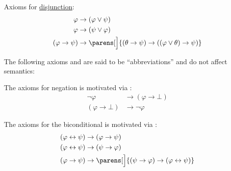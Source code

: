 \begin{definition}
\begin{thmenum}[series=def:minimal_propositional_axiomatic_derivation_system]
     Axioms for \hyperref[def:propositional_language/connectives/disjunction]{disjunction}:
    \begin{align}
      \varphi                    &\rightarrow (\varphi \vee \psi) \label{eq:def:minimal_propositional_axiomatic_derivation_system/or_elim_left} \\
      \varphi                    &\rightarrow (\psi \vee \varphi) \label{eq:def:minimal_propositional_axiomatic_derivation_system/or_elim_right} \\
      (\varphi \rightarrow \psi) &\rightarrow \parens[\Big]{ (\theta \rightarrow \psi) \rightarrow ((\varphi \vee \theta) \rightarrow \psi) } \label{eq:def:minimal_propositional_axiomatic_derivation_system/or_intro}
    \end{align}
  \end{thmenum}

  The following axioms and are said to be \enquote{abbreviations} and do not affect semantics:
  \begin{thmenum}[resume=def:minimal_propositional_axiomatic_derivation_system]
     The axioms for negation is motivated via :
    \begin{align}
      \neg \varphi &\rightarrow (\varphi \rightarrow \bot) \label{eq:def:minimal_propositional_axiomatic_derivation_system/neg_elim} \\
      (\varphi \rightarrow \bot) &\rightarrow \neg \varphi \label{eq:def:minimal_propositional_axiomatic_derivation_system/neg_intro}
    \end{align}

     The axioms for the biconditional is motivated via :
    \begin{align}
      (\varphi \leftrightarrow \psi) &\rightarrow (\varphi \rightarrow \psi) \label{eq:def:minimal_propositional_axiomatic_derivation_system/equiv_elim_left} \\
      (\varphi \leftrightarrow \psi) &\rightarrow (\psi \rightarrow \varphi) \label{eq:def:minimal_propositional_axiomatic_derivation_system/equiv_elim_right} \\
      (\varphi \rightarrow \psi)     &\rightarrow \parens[\Big]{ (\psi \rightarrow \varphi) \rightarrow (\varphi \leftrightarrow \psi) } \label{def:minimal_propositional_axiomatic_derivation_system/eq:equiv_intro}
    \end{align}
  \end{thmenum}
\end{definition}

